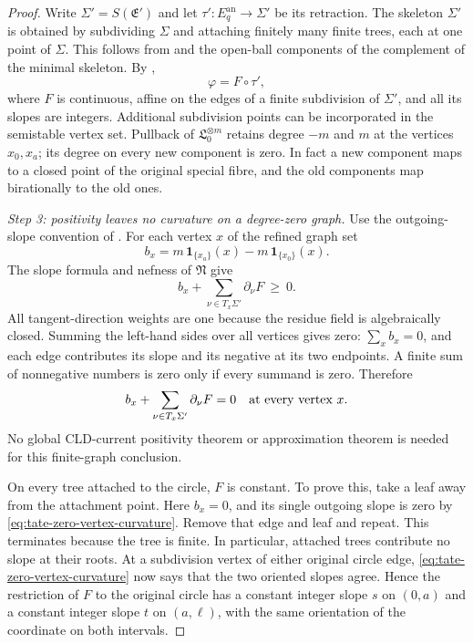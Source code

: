 \begin{proof}
Write $\Sigma'=S(\mathfrak E')$ and let
$\tau':E_q^{\mathrm{an}}\to\Sigma'$ be its retraction.
The skeleton $\Sigma'$ is obtained by subdividing $\Sigma$ and
attaching finitely many finite trees, each at one point of $\Sigma$.
This follows from \cite[Proposition 3.13]{BPR14} and the open-ball components
of the complement of the minimal skeleton. By
\cite[Proposition 3.5]{GJKM19},
\[
 \varphi=F\circ\tau',
\]
where $F$ is continuous, affine on the edges of a finite subdivision
of $\Sigma'$, and all its slopes are integers. Additional subdivision
points can be incorporated in the semistable vertex set.
Pullback of $\mathfrak L_0^{\otimes m}$ retains degree $-m$ and
$m$ at the vertices $x_0,x_a$; its degree on every new component
is zero. In fact a new component maps to a closed point of the original
special fibre, and the old components map birationally to the old ones.

\emph{Step 3: positivity leaves no curvature on a degree-zero graph.}
Use the outgoing-slope convention of \cite[Proposition 3.7]{GJKM19}. For
each vertex $x$ of the refined graph set
\[
 b_x=m\,\mathbf 1_{\{x_a\}}(x)-m\,\mathbf 1_{\{x_0\}}(x).
\]
The slope formula and nefness of $\mathfrak N$ give
\begin{equation}
\label{eq:tate-nef-vertex-inequality}
 b_x+\sum_{\nu\in T_x\Sigma'}\partial_\nu F\ \geq\ 0.
\end{equation}
All tangent-direction weights are one because the residue field is
algebraically closed. Summing the left-hand sides over all vertices
gives zero: $\sum_x b_x=0$, and each edge contributes its slope and
its negative at its two endpoints. A finite sum of nonnegative numbers
is zero only if every summand is zero. Therefore
\begin{equation}
\label{eq:tate-zero-vertex-curvature}
 b_x+\sum_{\nu\in T_x\Sigma'}\partial_\nu F=0
 \quad\hbox{at every vertex }x.
\end{equation}
No global CLD-current positivity theorem or approximation theorem is
needed for this finite-graph conclusion.

On every tree attached to the circle, $F$ is constant. To prove this,
take a leaf away from the attachment point. Here $b_x=0$, and its
single outgoing slope is zero by
\eqref{eq:tate-zero-vertex-curvature}. Remove that edge and leaf and
repeat. This terminates because the tree is finite. In particular,
attached trees contribute no slope at their roots.
At a subdivision vertex of either original circle edge,
\eqref{eq:tate-zero-vertex-curvature} now says that the two oriented
slopes agree. Hence the restriction of $F$ to the original circle
has a constant integer slope $s$ on $(0,a)$ and a constant integer
slope $t$ on $(a,\ell)$, with the same orientation of the
coordinate on both intervals.


\end{proof}
